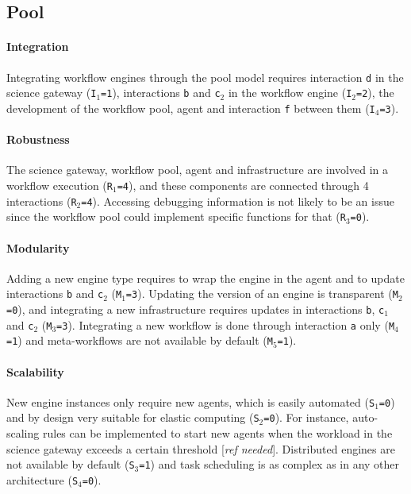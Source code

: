 \documentclass[preprint,3p,twocolumn]{elsarticle}
\newcommand{\todo}[1]{\color{blue}\xspace[\emph{#1}]\xspace\color{black}}
\begin{document}
\subsection{Pool}

\paragraph{Integration} Integrating workflow engines through the pool
model requires interaction \texttt{d} in the science gateway
(\texttt{I$_1$=1}), interactions \texttt{b} and \texttt{c$_2$} in the
workflow engine (\texttt{I$_2$=2}), the development of the workflow
pool, agent and interaction \texttt{f} between them
(\texttt{I$_4$=3}).

\paragraph{Robustness} The science gateway, workflow pool, agent and
infrastructure are involved in a workflow execution
(\texttt{R$_1$=4}), and these components are connected through 4
interactions (\texttt{R$_2$=4}). Accessing debugging information is
not likely to be an issue since the workflow pool could implement
specific functions for that (\texttt{R$_3$=0}). 

\paragraph{Modularity} Adding a new engine type requires to wrap the
engine in the agent and to update interactions \texttt{b} and
\texttt{c$_2$} (\texttt{M$_1$=3}). Updating the version of an engine
is transparent (\texttt{M$_2$=0}), and integrating a new
infrastructure requires updates in interactions \texttt{b},
\texttt{c$_1$} and \texttt{c$_2$} (\texttt{M$_3$=3}). Integrating a
new workflow is done through interaction \texttt{a} only
(\texttt{M$_4$=1}) and meta-workflows are not available by default
(\texttt{M$_5$=1}).

\paragraph{Scalability} New engine instances only require new agents,
which is easily automated (\texttt{S$_1$=0}) and by design very
suitable for elastic computing (\texttt{S$_2$=0}). For instance,
auto-scaling rules can be implemented to start new agents when the
workload in the science gateway exceeds a certain threshold \todo{ref
  needed}. Distributed engines are not available by default
(\texttt{S$_3$=1}) and task scheduling is as complex as in any other
architecture (\texttt{S$_4$=0}).
\end{document}
